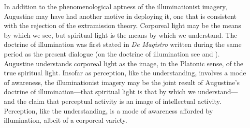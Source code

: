 \documentclass[12pt]{article}
\begin{document}

In addition to the phenomenological aptness of the illuminationist imagery, Augustine may have had another motive in deploying it, one that is consistent with the rejection of the extramission theory. Corporeal light may be the means by which we see, but spiritual light is the means by which we understand. The doctrine of illumination was first stated in \emph{De Magistro} written during the same period as the present dialogue (on the doctrine of illumination see \citealt{Allers:1952os} and \citealt{Matthews:2014aa}). Augustine understands corporeal light as the image, in the Platonic sense, of the true spiritual light.  Insofar as perception, like the understanding, involves a mode of awareness, the illuminationist imagery may be the joint result of Augustine's doctrine of illumination---that spiritual light is that by which we understand---and the claim that perceptual activity is an image of intellectual activity. Perception, like the understanding, is a mode of awareness afforded by illumination, albeit of a corporeal variety. 

\end{document}
